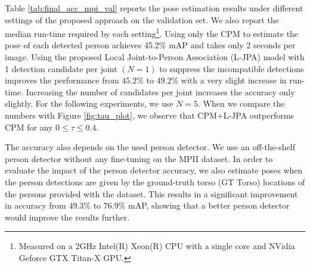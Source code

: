 \documentclass[runningheads]{llncs}
\begin{document}
Table \ref{tab:final_acc_mpi_val} reports the pose estimation results under different settings of the proposed approach on the validation set. We also report the median run-time required by each setting\footnote{Measured on a 2GHz Intel(R) Xeon(R) CPU with a single core and NVidia Geforce GTX Titan-X GPU.}. Using only the CPM to estimate the pose of each detected person achieves 45.2\% mAP and takes only 2 seconds per image. Using the proposed Local Joint-to-Person Association (L-JPA) model with 1 detection candidate per joint $(N=1)$ to suppress the incompatible detections improves the performance from $45.2\%$ to $49.2\%$ with a very slight increase in run-time. Increasing the number of candidates per joint increases the accuracy only slightly. For the following experiments, we use $N=5$. When we compare the numbers with Figure \ref{fig:tau_plot}, we observe that CPM+L-JPA outperforms CPM for any $0 \leq \tau \leq 0.4$.

The accuracy also depends on the used person detector. We use an off-the-shelf person detector without any fine-tuning on the MPII dataset. In order to evaluate the impact of the person detector accuracy, we also estimate poses when the person detections are given by the ground-truth torso (GT Torso) locations of the persons provided with the dataset. 
This results in a significant improvement in accuracy from $49.3\%$ to $76.9\%$ mAP, showing that a better person detector would improve the results further.

\begin{table*}[t]
  \centering
  \footnotesize
  \setlength{\tabcolsep}{2.8pt} 
\def\arraystretch{1}

  \caption{Comparison of pose estimation results (AP) with state-of-the-art approaches on 288 images \cite{pishchulin2015deepcut}.}
  \label{tab:final_acc_288_images}
\end{table*}
\end{document}
